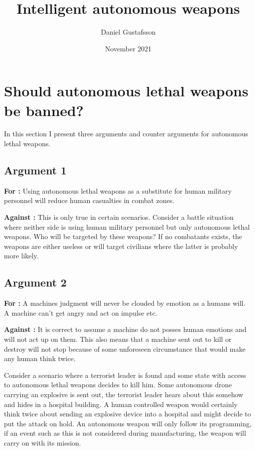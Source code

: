 \documentclass[11pt, a4paper]{article}
\title{Intelligent autonomous weapons}
\author{Daniel Gustafsson}
\date{November 2021}
\begin{document}
\maketitle

\section{Should autonomous lethal weapons be banned?}
In this section I present three arguments and counter arguments for autonomous lethal weapons.
\subsection{Argument 1}
\textbf{For :} Using autonomous lethal weapons as a substitute for human military personnel will reduce human casualties in combat zones.

\vspace{2mm}\noindent\textbf{Against :} This is only true in certain scenarios. Consider a battle situation where neither side is using
human military personnel but only autonomous lethal weapons. Who will be targeted by these weapons? If no combatants exists, the weapons
are either useless or will target civilians where the latter is probably more likely.

\subsection{Argument 2}
\textbf{For :} A machines judgment will never be clouded by emotion as a humans will. A machine can't get angry and act on impulse etc.

\vspace{2mm}\noindent\textbf{Against :} It is correct to assume a machine do not posses human emotions and will not act up on them.
This also means that a machine sent out to kill or destroy will not stop because of some unforeseen circumstance that would make any
human think twice. 

Consider a scenario where a terrorist leader is found and some state with access to autonomous lethal weapons decides
to kill him. Some autonomous drone carrying an explosive is sent out, the terrorist leader hears about this somehow and hides in a 
hospital building. A human controlled weapon would certainly think twice about sending an explosive device into a hospital and might
decide to put the attack on hold. An autonomous weapon will only follow its programming, if an event such as this is not considered
during manufacturing, the weapon will carry on with its mission.
\end{document}
